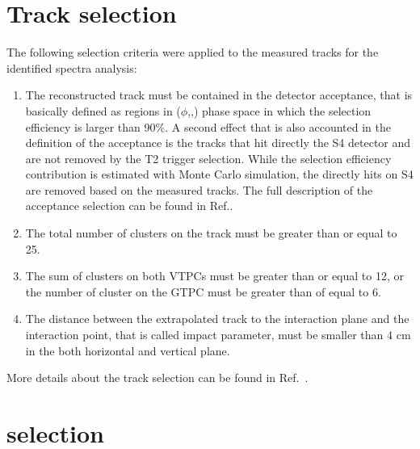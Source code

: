 \section{Track selection}
\label{sec:hadron:trackselection}



The following selection criteria were applied to the measured tracks
for the identified spectra analysis:
\begin{enumerate}[label=(\roman*)]
\item The reconstructed track must be contained in the detector acceptance,
  that is basically defined as regions in ($\phi$,\pp,\pT) phase space
  in which the selection efficiency is larger than 90\%. A second effect
  that is also accounted in the definition of the acceptance is the tracks that
  hit directly the S4 detector and are not removed by the T2 trigger selection.
  While the selection efficiency contribution is estimated with Monte Carlo simulation,
  the directly hits on S4 are removed based on the measured tracks.
  The full description of the acceptance selection can be found in Ref.\cite{MartinThesis}.
\item The total number of clusters on the track must be greater than or equal to 25.
\item The sum of clusters on both VTPCs must be greater than or equal to 12, or
  the number of cluster on the GTPC must be greater than of equal to 6.
\item The distance between the extrapolated track to the interaction plane and the
  interaction point, that is called impact parameter, must be smaller than 4 cm
  in the both horizontal and vertical plane.
\end{enumerate}
More details about the track selection
can be found in Ref.~\cite{MartinThesis}.



\section{\vzero selection}
\label{sec:hadron:vzeroselection}


